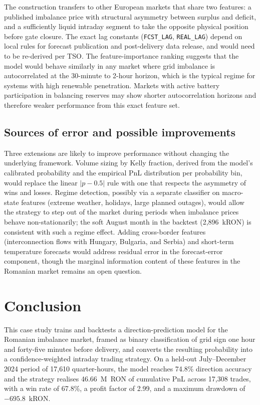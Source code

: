 \documentclass{article}
\begin{document}
The construction transfers to other European markets that share two features: a published imbalance price with structural asymmetry between surplus and deficit, and a sufficiently liquid intraday segment to take the opposite physical position before gate closure. The exact lag constants (\texttt{FCST\_LAG}, \texttt{REAL\_LAG}) depend on local rules for forecast publication and post-delivery data release, and would need to be re-derived per TSO. The feature-importance ranking suggests that the model would behave similarly in any market where grid imbalance is autocorrelated at the 30-minute to 2-hour horizon, which is the typical regime for systems with high renewable penetration. Markets with active battery participation in balancing reserves may show shorter autocorrelation horizons and therefore weaker performance from this exact feature set.

\subsection{Sources of error and possible improvements}

Three extensions are likely to improve performance without changing the underlying framework. Volume sizing by Kelly fraction, derived from the model's calibrated probability and the empirical PnL distribution per probability bin, would replace the linear $|p - 0.5|$ rule with one that respects the asymmetry of wins and losses. Regime detection, possibly via a separate classifier on macro-state features (extreme weather, holidays, large planned outages), would allow the strategy to step out of the market during periods when imbalance prices behave non-stationarily; the soft August month in the backtest (2{,}896~kRON) is consistent with such a regime effect. Adding cross-border features (interconnection flows with Hungary, Bulgaria, and Serbia) and short-term temperature forecasts would address residual error in the forecast-error component, though the marginal information content of these features in the Romanian market remains an open question.

\section{Conclusion}

This case study trains and backtests a direction-prediction model for the Romanian imbalance market, framed as binary classification of grid sign one hour and forty-five minutes before delivery, and converts the resulting probability into a confidence-weighted intraday trading strategy. On a held-out July--December 2024 period of 17{,}610 quarter-hours, the model reaches 74.8\% direction accuracy and the strategy realises 46.66~M~RON of cumulative PnL across 17{,}308 trades, with a win rate of 67.8\%, a profit factor of 2.99, and a maximum drawdown of $-695.8$~kRON.
\end{document}
